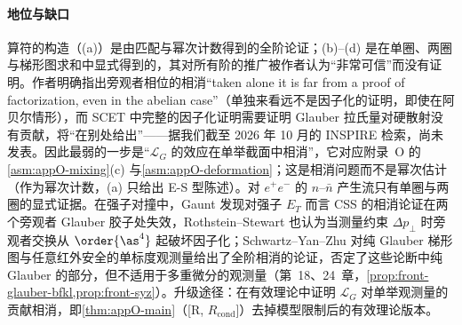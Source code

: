 \paragraph{地位与缺口}
算符的构造（(a)）是由匹配与幂次计数得到的全阶论证；(b)--(d) 是在单圈、两圈与梯形图求和中显式得到的，其对所有阶的推广被作者认为“非常可信”而没有证明\cite[第~10~节]{RothsteinStewart2016}。作者明确指出旁观者相位的相消“taken alone it is far from a proof of factorization, even in the abelian case”（单独来看远不是因子化的证明，即使在阿贝尔情形）\cite[第~11.1~节]{RothsteinStewart2016}，而 SCET 中完整的因子化证明需要证明 Glauber 拉氏量对硬散射没有贡献，将“在别处给出”\cite[第~11~节]{RothsteinStewart2016}——据我们截至 2026 年 10 月的 INSPIRE 检索，尚未发表。因此最弱的一步是“$\mathcal L_G$ 的效应在单举截面中相消”，它对应附录~O 的\cref{asm:appO-mixing}(c) 与\cref{asm:appO-deformation}；这是相消问题而不是幂次估计（作为幂次计数，(a) 只给出 E-S 型陈述）。对 $e^+e^-$ 的 $n$–$\bar n$ 产生流只有单圈与两圈的显式证据\cite[第~10~节]{RothsteinStewart2016}。在强子对撞中，Gaunt 发现对强子 $E_T$ 而言 CSS 的相消论证在两个旁观者 Glauber 胶子处失效\cite{Gaunt2014}，Rothstein--Stewart 也认为当测量约束 $\Delta p_\perp$ 时旁观者交换从 $\order{\as^4}$ 起破坏因子化\cite[第~11.1~节]{RothsteinStewart2016}；Schwartz--Yan--Zhu 对纯 Glauber 梯形图与任意红外安全的单标度观测量给出了全阶相消的论证，否定了这些论断中纯 Glauber 的部分，但不适用于多重微分的观测量\cite{Schwartz:2018obd}（第~18、24~章，\cref{prop:front-glauber-bfkl,prop:front-syz}）。升级途径：在有效理论中证明 $\mathcal L_G$ 对单举观测量的贡献相消，即\cref{thm:appO-main}（[R, $R_{\mathrm{cond}}$]）去掉模型限制后的有效理论版本。


